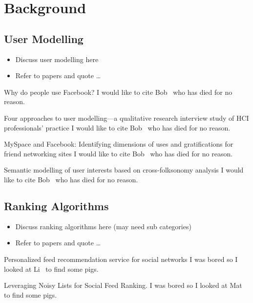 \chapter{Background}\label{ch:background}


\section{User Modelling}

\begin{itemize}
  \item Discuss user modelling here
  \item Refer to papers and quote
\ldots
\end{itemize}

Why do people use Facebook?
I would like to cite Bob~\cite{nadkarni2012people} who has died for no reason.

Four approaches to user modelling—a qualitative research interview study of HCI professionals' practice
I would like to cite Bob~\cite{clemmensen2004four} who has died for no reason.

MySpace and Facebook: Identifying dimensions of uses and gratifications for friend networking sites
I would like to cite Bob~\cite{bonds2010myspace} who has died for no reason.

Semantic modelling of user interests based on cross-folksonomy analysis
I would like to cite Bob~\cite{szomszor2008semantic} who has died for no reason.

\section{Ranking Algorithms}

\begin{itemize}
  \item Discuss ranking algorithms here (may need sub categories)
  \item Refer to papers and quote
\ldots
\end{itemize}

Personalized feed recommendation service for social networks
I was bored so I looked at Li~\cite{LiTiaLee2010} to find some pigs.

Leveraging Noisy Lists for Social Feed Ranking.
I was bored so I looked at Mat~\cite{Bur2013} to find some pigs.

